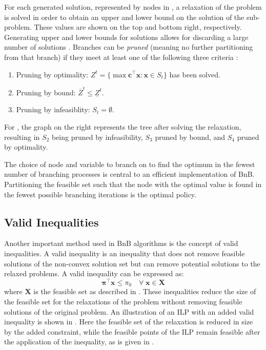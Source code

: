 For each generated solution, represented by nodes in , a relaxation of the problem is solved in order to obtain an upper and lower bound on the solution of the sub-problem. 
These values are shown on the top and bottom right, respectively. 
Generating upper and lower bounds for solutions allows for discarding a large number of solutions \cite{wolsey2020integer}. Branches can be \textit{pruned} (meaning no further partitioning from that branch) if they meet at least one of the following three criteria \cite{wolsey2020integer}:
\newpage
\begin{enumerate}[label=(\roman*)]
    \item Pruning by optimality: $Z^t = \{\max \bm{c}^{\top} \bm{x} : \bm{x} \in S_t\}$ has been solved.
    \item Pruning by bound: $\overline{Z}^t \leq \underline{Z}^t$.
    \item Pruning by infeasiblity: $S_t = \emptyset $.
\end{enumerate}
For , the graph on the right represents the tree after solving the relaxation, resulting in $S_2$ being pruned by infeasibility, $S_3$ pruned by bound, and $S_4$ pruned by optimality.


The choice of node and variable to branch on to find the optimum in the fewest number of branching processes is central to an efficient implementation of \gls{BnB}. Partitioning the feasible set such that the node with the optimal value is found in the fewest possible branching iterations is the optimal policy. 


\subsection{Valid Inequalities}\label{ssec:inequalities}

Another important method used in \gls{BnB} algorithms is the concept of valid inequalities. A valid inequality is an inequality that does not remove feasible solutions of the non-convex solution set but can remove potential solutions to the relaxed problems. A valid inequality can be expressed as:
\begin{equation}\label{eq:cut}
    \bm{\pi}^{\top} \mathbf{x} \leq \pi_0 \quad \forall \; \mathbf{x} \in  \bm{X}   
\end{equation}
where $\bm{X}$ is the feasible set as described in . These inequalities reduce the size of the feasible set for the relaxations of the problem without removing feasible solutions of the original problem. An illustration of an \gls{ILP} with an added valid inequality is shown in . Here the feasible set of the relaxation is reduced in size by the added constraint, while the feasible points of the \gls{ILP} remain feasible after the application of the inequality, as is given in .

